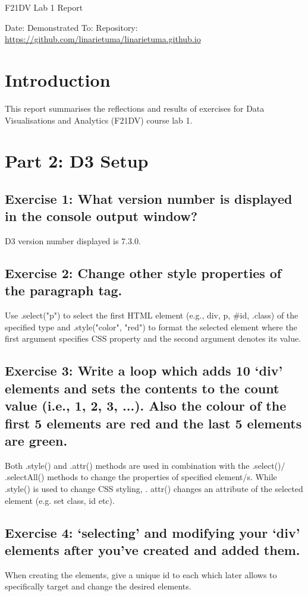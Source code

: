 \documentclass[11pt]{article}   	%
\begin{document}
\begin{center}
  \Huge{F21DV Lab 1 Report}
\end{center}
Date:  \linebreak
Demonstrated To: \linebreak
Repository: \url{https://github.com/linarietuma/linarietuma.github.io} 

\section{Introduction}

This report summarises the reflections and results of exercises for Data Visualisations and Analytics (F21DV) course lab 1.

\section{Part 2: D3 Setup}
\subsection{Exercise 1: What version number is displayed in the console output window?}

D3 version number displayed is 7.3.0.

\subsection{Exercise 2: Change other style properties of the paragraph tag.}

Use .select("p") to select the first HTML element (e.g., div, p, \#id, .class) of the specified type and .style("color", "red") to format the selected element where the first argument specifies CSS property and the second argument denotes its value.

\subsection{Exercise 3: Write a loop which adds 10 ‘div’ elements and sets the contents to the count value (i.e., 1, 2, 3, ...). Also the colour of the first 5 elements are red and the last 5 elements are green.}
Both .style() and .attr() methods are used in combination with the .select()/ .selectAll() methods to change the properties of specified element/s. While .style() is used to change CSS styling, . attr() changes an attribute of the selected element (e.g. set class, id etc).

\subsection{Exercise 4: ‘selecting’ and modifying your ‘div’ elements after you’ve created and added them.}
When creating the elements, give a unique id to each which later allows to specifically target and change the desired elements. 
\end{document}
